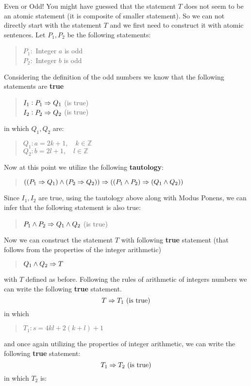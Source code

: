 \begin{example}{Even or Odd!}
	You might have guessed that the statement $ T $ does not seem to be an atomic statement (it is composite of smaller statement). So we can not directly start with the statement $ T $ and we first need to construct it with atomic sentences. Let $ P_1, P_2 $ be the following statements:
	\begin{quote}
		\centering
		$ P_1: $ Integer $ a $ is odd \\
		$ P_2: $ Integer $ b $ is odd
	\end{quote}
	Considering the definition of the odd numbers we know that the following statements are \textbf{true}
	\begin{quote}
		\centering
		$ I_1: P_1 \Rightarrow Q_1 $ (is true)\\
		$ I_2: P_2 \Rightarrow Q_2 $ (is true)
	\end{quote}
	in which $ Q_1, Q_2 $ are:
	\begin{quote}
		\centering
		$ Q_1: a = 2k+1, \quad k \in \mathbb{Z} $ \\
		$ Q_2: b = 2l+1, \quad l \in \mathbb{Z} $
	\end{quote}
	Now at this point we utilize the following \textbf{tautology}:
	\begin{quote}
		\centering
		$ ((P_1 \Rightarrow Q_1) \wedge (P_2 \Rightarrow Q_2)) \Rightarrow ((P_1 \wedge P_2) \Rightarrow (Q_1 \wedge Q_2))  $
	\end{quote}
	Since $ I_1, I_2 $ are true, using the tautology above along with Modus Ponens, we can infer that the following statement is also true:
	\begin{quote}
		\centering
		$ P_1 \wedge P_2 \Rightarrow Q_1 \wedge Q_2 $ (is true)
	\end{quote}
	Now we can construct the statement $ T $ with following \textbf{true} statement (that follows from the properties of the integer arithmetic) 
	\begin{quote}
		\centering
		$ Q_1 \wedge Q_2 \Rightarrow T $
	\end{quote}
	with $ T $ defined as before. Following the rules of arithmetic of integers numbers we can write the following \textbf{true} statement.
	\[ T \Rightarrow T_1 \text{ (is true)} \]
	in which 
	\begin{quote}
		\centering
		$ T_1: s = 4kl + 2(k+l) + 1 $
	\end{quote}
	and once again utilizing the properties of integer arithmetic, we can write the following \textbf{true} statement:
	\[ T_1 \Rightarrow T_2 \text{ (is true)} \]
	in which $ T_2 $ is:
	\begin{quote}
		\centering

\end{quote}
\end{example}
